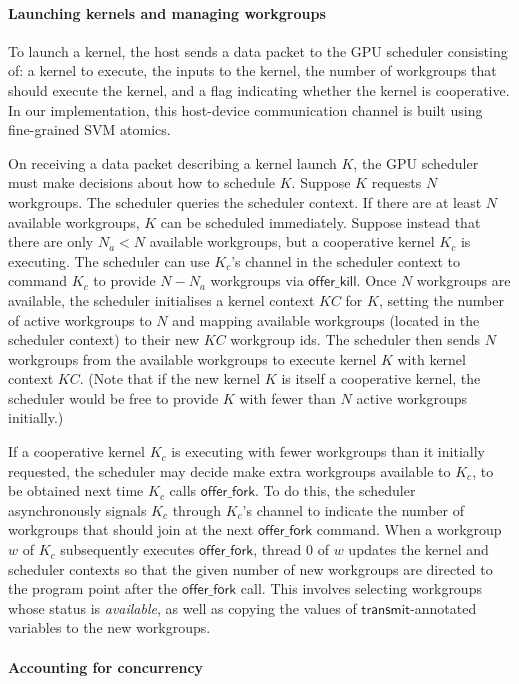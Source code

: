 \documentclass[numbers,nocopyrightspace,10pt]{sigplanconf}
\newcommand{\KC}{\mathit{KC}}
\newcommand{\transmit}{\mathsf{transmit}}
\newcommand{\offerfork}{\mathsf{offer\_fork}}
\newcommand{\offerkill}{\mathsf{offer\_kill}}
\begin{document}
\paragraph{Launching kernels and managing workgroups}

To launch a kernel, the host sends a data packet to the GPU
scheduler consisting of: a kernel to execute, the inputs to the kernel, the
number of workgroups that should execute the kernel, and a flag indicating whether the kernel
is cooperative. In our implementation, this host-device communication channel is built using fine-grained SVM atomics.

On receiving a data packet
describing a kernel launch $K$, the GPU scheduler must make decisions
about how to schedule $K$. Suppose $K$ requests
$N$ workgroups. The scheduler queries the scheduler context.  If
there are at least $N$ available workgroups, $K$ can be scheduled
immediately. Suppose instead that there are only $N_a < N$ available workgroups, but a cooperative kernel $K_c$ is
executing. The scheduler can use $K_c$'s channel in the scheduler context to command $K_c$ to provide $N - N_a$ workgroups via $\offerkill$.
Once $N$ workgroups are available, the scheduler initialises a
kernel context $\KC$ for $K$, setting the number of active workgroups
to $N$ and mapping available workgroups (located in the scheduler
context) to their new $\KC$ workgroup ids. The scheduler then sends $N$
workgroups from the available workgroups to execute kernel $K$ with
kernel context $\KC$.  (Note that if the new kernel $K$ is itself a cooperative kernel, the scheduler would be free to provide $K$ with fewer than $N$ active workgroups initially.)

If a cooperative kernel $K_c$ is executing with fewer workgroups than it initially requested, the scheduler may decide make extra workgroups available
to $K_c$, to be obtained next time $K_c$ calls $\offerfork$.  To do this, the scheduler asynchronously signals $K_c$ through $K_c$'s
channel to indicate the number of
workgroups that should join at the next $\offerfork$ command.
When a workgroup $w$ of $K_c$ subsequently executes $\offerfork$, thread 0 of $w$ updates the kernel and scheduler contexts so that the given number of new workgroups are directed to the program point after the $\offerfork$ call.  This involves selecting workgroups whose status is \emph{available}, as well as copying the values of $\transmit$-annotated variables to the new workgroups.

\paragraph{Accounting for concurrency}
\end{document}
